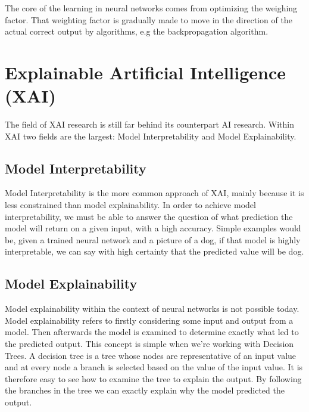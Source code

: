 The core of the learning in neural networks comes from optimizing the weighing factor. That weighting factor is gradually made to move in the direction of the actual correct output by algorithms, e.g the backpropagation algorithm\cite{rumelhard:backprop}.



\section{Explainable Artificial Intelligence (XAI)}

The field of XAI research is still far behind its counterpart AI research\cite{tjoa:surveyxai}. Within XAI two fields are the largest: Model Interpretability and Model Explainability.

\subsection{Model Interpretability}

Model Interpretability is the more common approach of XAI, mainly because it is less constrained than model explainability. In order to achieve model interpretability, we must be able to answer the question of what prediction the model will return on a given input, with a high accuracy. Simple examples would be, given a trained neural network and a picture of a dog, if that model is highly interpretable, we can say with high certainty that the predicted value will be dog.

\subsection{Model Explainability}

Model explainability within the context of neural networks is not possible today. Model
explainability refers to firstly considering some input and output from a model. Then
afterwards the model is examined to determine exactly what led to the predicted output.
This concept is simple when we're working with Decision Trees. A decision tree is a tree
whose nodes are representative of an input value and at every node a branch is selected
based on the value of the input value. It is therefore easy to see how to examine the tree
to explain the output. By following the branches in the tree we can exactly explain why the model predicted the output.

